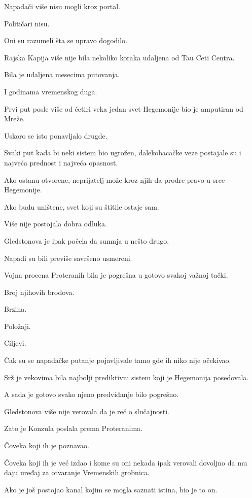 Napadači više nisu mogli kroz portal.

Političari nisu.

Oni su razumeli šta se upravo dogodilo.

Rajska Kapija više nije bila nekoliko koraka udaljena od Tau Ceti Centra.

Bila je udaljena mesecima putovanja.

I godinama vremenskog duga.

Prvi put posle više od četiri veka jedan svet Hegemonije bio je amputiran od Mreže.

\bigskip

Uskoro se isto ponavljalo drugde.

Svaki put kada bi neki sistem bio ugrožen, dalekobacačke veze postajale su i najveća prednost i najveća opasnost.

Ako ostanu otvorene, neprijatelj može kroz njih da prodre pravo u srce Hegemonije.

Ako budu uništene, svet koji su štitile ostaje sam.

Više nije postojala dobra odluka.

\bigskip

Gledstonova je ipak počela da sumnja u nešto drugo.

Napadi su bili previše savršeno usmereni.

Vojna procena Proteranih bila je pogrešna u gotovo svakoj važnoj tački.

Broj njihovih brodova.

Brzina.

Položaji.

Ciljevi.

Čak su se napadačke putanje pojavljivale tamo gde ih niko nije očekivao.

Srž je vekovima bila najbolji prediktivni sistem koji je Hegemonija posedovala.

A sada je gotovo svako njeno predviđanje bilo pogrešno.

Gledstonova više nije verovala da je reč o slučajnosti.

\bigskip

Zato je Konzula poslala prema Proteranima.

Čoveka koji ih je poznavao.

Čoveka koji ih je već izdao i kome su oni nekada ipak verovali dovoljno da mu daju uređaj za otvaranje Vremenskih grobnica.

Ako je još postojao kanal kojim se mogla saznati istina, bio je to on.

